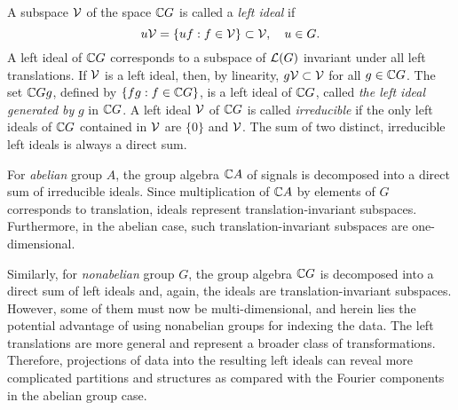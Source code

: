 A subspace $\mathcal{V}$ of the space $\mathbb{C} G$ is called a
\emph{left ideal} if 
\begin{equation}
u\mathcal{V} = \{uf : f \in \mathcal{V}\} \subset \mathcal{V}, \quad u \in G. 
\end{equation}
A left ideal of $\mathbb{C} G$ corresponds to a subspace of $\mathcal{L}(G)$
invariant under all left translations.  If $\mathcal{V}$ is a
left ideal, then, by linearity, 
$g\mathcal{V} \subset \mathcal{V}$ for all $g \in \mathbb{C} G$.
The set $\mathbb{C} G g$, defined by 
$\{fg : f \in \mathbb{C} G\}$, is a left ideal of $\mathbb{C} G$,
called \emph{the left ideal generated by} $g$ in $\mathbb{C} G$. 
A left ideal $\mathcal{V}$ of $\mathbb{C} G$ is called \emph{irreducible}
if the only left ideals of $\mathbb{C} G$ contained in $\mathcal{V}$ are
$\{0\}$ and $\mathcal{V}$. The sum of two distinct, irreducible
left ideals is always a direct sum. 

For \emph{abelian} group $A$, the group algebra $\mathbb{C} A$ of
signals is decomposed into a direct sum of irreducible ideals.  
Since multiplication of $\mathbb{C} A$ by elements of $G$
corresponds to translation, ideals represent
translation-invariant subspaces.  Furthermore, in the 
abelian case, such translation-invariant subspaces are
one-dimensional.   

Similarly, for \emph{nonabelian} group $G$, the group algebra
$\mathbb{C} G$ is decomposed into a direct sum of left ideals
and, again, the ideals are translation-invariant
subspaces.  However, some of them must now be multi-dimensional,
and herein lies the potential advantage of using nonabelian
groups for indexing the data. The left translations
are more general and represent a broader class of 
transformations. Therefore, projections of data into the
resulting left ideals can reveal more complicated partitions
and structures as compared with the Fourier components in
the abelian group case. 

